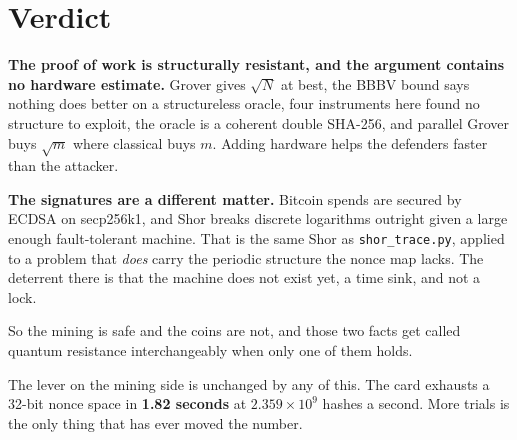 \section{Verdict}

\textbf{The proof of work is structurally resistant, and the argument contains no hardware
estimate.} Grover gives \(\sqrt{N}\) at best, the BBBV bound says nothing does better on a
structureless oracle, four instruments here found no structure to exploit, the oracle is a coherent
double SHA-256, and parallel Grover buys \(\sqrt{m}\) where classical buys \(m\). Adding hardware
helps the defenders faster than the attacker.

\textbf{The signatures are a different matter.} Bitcoin spends are secured by ECDSA on secp256k1,
and Shor breaks discrete logarithms outright given a large enough fault-tolerant machine. That is
the same Shor as \texttt{shor\_trace.py}, applied to a problem that \emph{does} carry the periodic
structure the nonce map lacks. The deterrent there is that the machine does not exist yet, a
time sink, and not a lock.

So the mining is safe and the coins are not, and those two facts get called quantum resistance
interchangeably when only one of them holds.

The lever on the mining side is unchanged by any of this. The card exhausts a 32-bit nonce space in
\textbf{1.82 seconds} at \(2.359 \times 10^{9}\) hashes a second. More trials is the only thing that
has ever moved the number.
